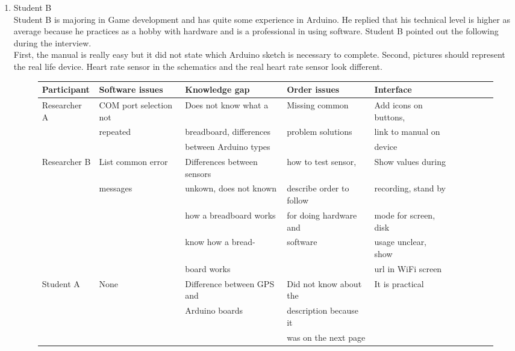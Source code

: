 \documentclass[conference]{IEEEtran}
\begin{document}
\begin{enumerate}
\begin{enumerate}
					\item Student B\\
					Student B is majoring in Game development and has  quite some experience in Arduino. He replied that his technical level is higher as average because he practices as a hobby with hardware and is a professional in using software. Student B pointed out the following during the interview.\\
					First, the manual is really easy but it did not state which Arduino sketch is necessary to complete.
					Second, pictures should represent the real life device. Heart rate sensor in the schematics and the real heart rate sensor look different.\\
		\begin{figure*}[!ht]
			\centering
			\begin{tabular}{ | l | l | l | l | l | l | l | l | l | l | }
				\hline
			Participant		& Software issues			& Knowledge gap					& Order issues				& Interface				\\ \hline \hline
			
			
			Researcher A	& COM port selection not	& Does not know what a			& Missing common			& Add icons on buttons,	\\ 
							& repeated					& breadboard, differences		& problem solutions			& link to manual on		\\ 
							& 							& between Arduino types			& 							& device				\\ \hline
							
			Researcher B	& List common error			& Differences between sensors	& how to test sensor,		& Show values during	\\ 
							& messages 					& unkown, does not known 		& describe order to	follow	& recording, stand by	\\
							& 							& how a breadboard works		& for doing	hardware and	& mode for screen, disk	\\
							& 							& know how a bread-				& software					& usage unclear, show	\\
							& 							& board works					& 							& url in WiFi screen	\\	\hline

			Student A		& None						& Difference between GPS and 	& Did not know about the	& It is practical		\\
							&  							& Arduino boards				& description because it 	& 						\\
							&  							& 								& was on the next page		& 						\\ \hline


\end{tabular}
\end{figure*}
\end{enumerate}
\end{enumerate}
\end{document}
